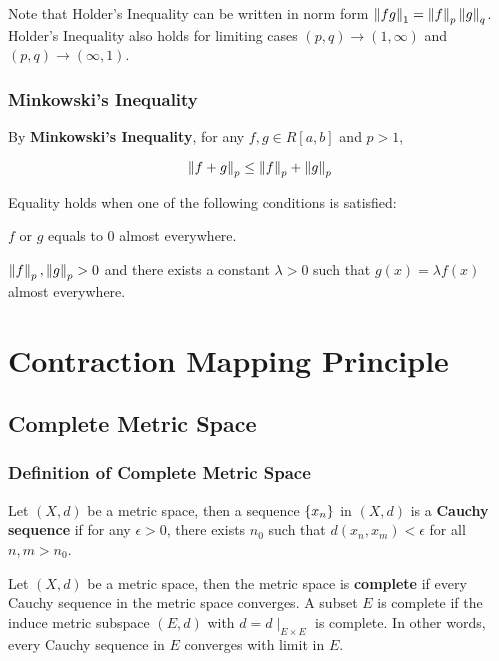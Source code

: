 \documentclass[a4paper,12pt]{article}
\begin{document}
Note that Holder's Inequality can be written in norm form $\left\| fg\right\|_{1}=\left\| f\right\|_{p}\left\| g\right\|_{q}$. Holder's Inequality also holds for limiting cases $(p,q)\to(1,\infty)$ and $(p,q)\to(\infty,1)$.

\subsubsection{Minkowski's Inequality}
\begin{thm}
  By \textbf{Minkowski's Inequality}, for any $f,g\in R[a,b]$ and $p>1$,
  
  $$\left\| f+g\right\|_{p}\leq\left\| f\right\|_{p}+\left\| g\right\|_{p}$$\s

  Equality holds when one of the following conditions is satisfied:

  \begin{alist}
    \item $f$ or $g$ equals to $0$ almost everywhere.
    \item $\left\| f\right\|_{p},\left\| g\right\|_{p}>0$ and there exists a constant $\lambda>0$ such that $g(x)=\lambda f(x)$ almost everywhere.
  \end{alist}
\end{thm}

\pagebreak

\section{Contraction Mapping Principle}
\subsection{Complete Metric Space}
\subsubsection{Definition of Complete Metric Space}
\begin{dft}
  Let $(X,d)$ be a metric space, then a sequence $\left\{ x_{n}\right\}$ in $(X,d)$ is a \textbf{Cauchy sequence} if for any $\epsilon>0$, there exists $n_{0}$ such that $d(x_{n},x_{m})<\epsilon$ for all $n,m>n_{0}$.
\end{dft}\n

\begin{dft}
  Let $(X,d)$ be a metric space, then the metric space is \textbf{complete} if every Cauchy sequence in the metric space converges. A subset $E$ is complete if the induce metric subspace $(E,d)$ with $d=d\!\mid_{E\times E}$ is complete. In other words, every Cauchy sequence in $E$ converges with limit in $E$.
\end{dft}\n
\end{document}

